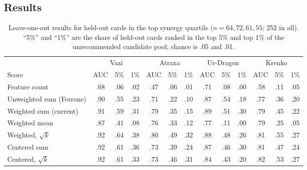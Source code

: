 \documentclass[11pt]{article}
\theoremstyle{remark}
\begin{document}
\subsection{Results}
\begin{table}[h]
\centering
\small
\begin{tabular}{l ccc ccc ccc ccc}
\toprule
 & \multicolumn{3}{c}{Vazi} & \multicolumn{3}{c}{Atraxa} & \multicolumn{3}{c}{Ur-Dragon} & \multicolumn{3}{c}{Krenko}\\
\cmidrule(lr){2-4}\cmidrule(lr){5-7}\cmidrule(lr){8-10}\cmidrule(lr){11-13}
Score & AUC & 5\% & 1\% & AUC & 5\% & 1\% & AUC & 5\% & 1\% & AUC & 5\% & 1\%\\
\midrule
Feature count            & .68 & .06 & .02 & .47 & .06 & .01 & .71 & .08 & .00 & .58 & .11 & .05\\
Unweighted sum (Ferrone) & .90 & .55 & .23 & .71 & .22 & .10 & .87 & .54 & .18 & .77 & .36 & .20\\
Weighted sum (current)   & .91 & .59 & .31 & .79 & .35 & .15 & .89 & .51 & .30 & .79 & .45 & .22\\
Weighted mean            & .87 & .41 & .08 & .76 & .33 & .12 & .77 & .11 & .00 & .79 & .25 & .05\\
Weighted, $\sqrt{k}$     & .92 & .64 & .38 & .80 & .49 & .32 & .88 & .48 & .26 & .81 & .55 & .27\\
Centered sum             & .92 & .61 & .36 & .73 & .39 & .24 & .87 & .46 & .30 & .81 & .47 & .24\\
Centered, $\sqrt{k}$     & .92 & .61 & .33 & .73 & .46 & .31 & .84 & .43 & .20 & .82 & .53 & .27\\
\bottomrule
\end{tabular}
\caption{Leave-one-out results for held-out cards in the top synergy quartile
($n=64, 72, 61, 55$; 252 in all). ``5\%'' and ``1\%'' are the share of held-out cards ranked in
the top 5\% and top 1\% of the unrecommended candidate pool; chance is .05 and
.01.}\label{tab:loo}
\end{table}
\end{document}

